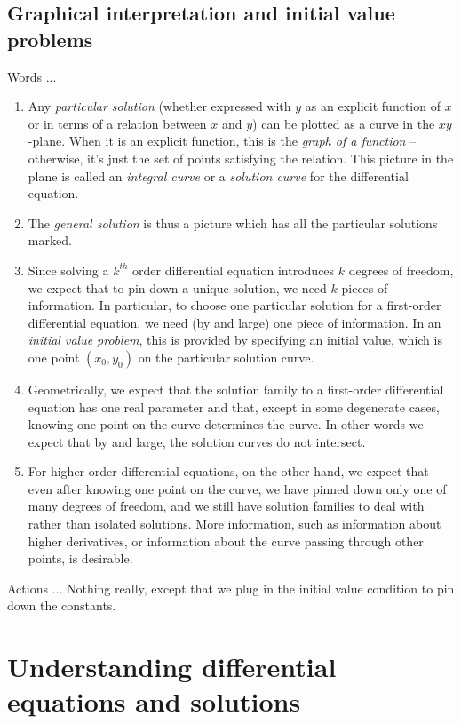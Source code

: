 \documentclass{amsart}
\begin{document}
\subsection{Graphical interpretation and initial value problems}

Words ...

\begin{enumerate}
\item Any {\em particular solution} (whether expressed with $y$ as an
  explicit function of $x$ or in terms of a relation between $x$ and
  $y$) can be plotted as a curve in the $xy$-plane. When it is an
  explicit function, this is the {\em graph of a function} --
  otherwise, it's just the set of points satisfying the relation. This
  picture in the plane is called an {\em integral curve} or a {\em
  solution curve} for the differential equation.
\item The {\em general solution} is thus a picture which has all the
  particular solutions marked.
\item Since solving a $k^{th}$ order differential equation introduces
  $k$ degrees of freedom, we expect that to pin down a unique
  solution, we need $k$ pieces of information. In particular, to
  choose one particular solution for a first-order differential
  equation, we need (by and large) one piece of information. In an
  {\em initial value problem}, this is provided by specifying an
  initial value, which is one point $(x_0,y_0)$ on the particular
  solution curve.
\item Geometrically, we expect that the solution family to a
  first-order differential equation has one real parameter and that,
  except in some degenerate cases, knowing one point on the curve
  determines the curve. In other words we expect that by and large,
  the solution curves do not intersect.
\item For higher-order differential equations, on the other hand, we
  expect that even after knowing one point on the curve, we have
  pinned down only one of many degrees of freedom, and we still have
  solution families to deal with rather than isolated solutions. More
  information, such as information about higher derivatives, or
  information about the curve passing through other points, is
  desirable.
\end{enumerate}

Actions ... Nothing really, except that we plug in the initial value
condition to pin down the constants.

\section{Understanding differential equations and solutions}
\end{document}
